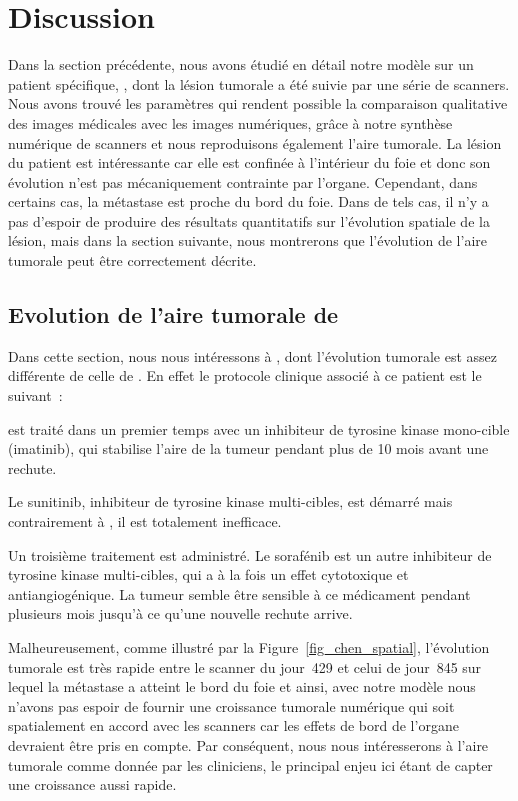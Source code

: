 \documentclass[main.tex]{subfiles}
\begin{document}
\section{Discussion}
Dans la section précédente, nous avons étudié en détail notre modèle sur un patient spécifique, \Nber, dont la lésion tumorale a été suivie par une série de scanners. Nous avons trouvé les paramètres qui rendent possible la comparaison qualitative des images médicales avec les images numériques, grâce à notre synthèse numérique de scanners et nous reproduisons également 
l'aire tumorale. La lésion du patient est intéressante car elle est confinée à l'intérieur du foie et donc son évolution n'est pas mécaniquement contrainte par l'organe. 
Cependant, dans certains cas, la métastase est proche du bord du foie. Dans de tels cas, il n'y a pas d'espoir de produire des résultats quantitatifs sur l'évolution spatiale de la lésion, mais dans la section suivante, nous montrerons que l'évolution de l'aire tumorale peut être correctement décrite.
\subsection{Evolution de l'aire tumorale de \Chen}\label{section chen}
Dans cette section, nous nous intéressons à \Chen, dont l'évolution tumorale est assez différente de celle de \Nber. En effet le protocole clinique associé à ce patient est le suivant~:
\begin{myenumerate}[label=\roman*)]
\item \Chen est traité dans un premier temps avec un inhibiteur de tyrosine kinase mono-cible (imatinib), qui stabilise l'aire de la tumeur pendant plus de 10 mois avant une rechute. 
\item Le sunitinib, inhibiteur de tyrosine kinase multi-cibles, est démarré mais contrairement à \Nber, il est totalement inefficace. 
\item Un troisième traitement est administré. Le sorafénib est un autre inhibiteur de tyrosine kinase multi-cibles, qui a à la fois un effet cytotoxique et antiangiogénique. La tumeur semble être sensible à ce médicament pendant plusieurs mois jusqu'à ce qu'une nouvelle rechute arrive. 
\end{myenumerate}
Malheureusement, comme illustré par la Figure~\ref{fig_chen_spatial}, l'évolution tumorale est très rapide entre le scanner du jour~429 et celui de jour~845 sur lequel la métastase a atteint le bord du foie et ainsi, avec notre modèle nous n'avons pas espoir de fournir une croissance tumorale numérique qui soit spatialement en accord avec les scanners car les effets de bord de l'organe devraient être pris en compte. Par conséquent, nous nous intéresserons à  l'aire tumorale comme donnée par les cliniciens, le principal enjeu ici étant de capter une croissance aussi rapide. 
\end{document}
